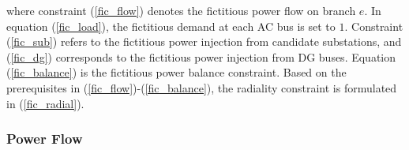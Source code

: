 \documentclass[a4paper,fleqn]{cas-dc}
\begin{document}
\noindent where constraint (\ref{fic_flow}) denotes the fictitious power flow 
on branch $ e $. In equation (\ref{fic_load}), the fictitious demand at each 
AC bus is set to $ 1 $. Constraint (\ref{fic_sub}) refers to the fictitious 
power injection from candidate substations, and (\ref{fic_dg}) corresponds to 
the fictitious power injection from DG buses. Equation (\ref{fic_balance}) is 
the fictitious power balance constraint. Based on the prerequisites in
(\ref{fic_flow})-(\ref{fic_balance}), the radiality constraint is formulated 
in (\ref{fic_radial}).

\vspace{4mm}

{\color{blue}
\subsubsection{Power Flow}
}
\end{document}
